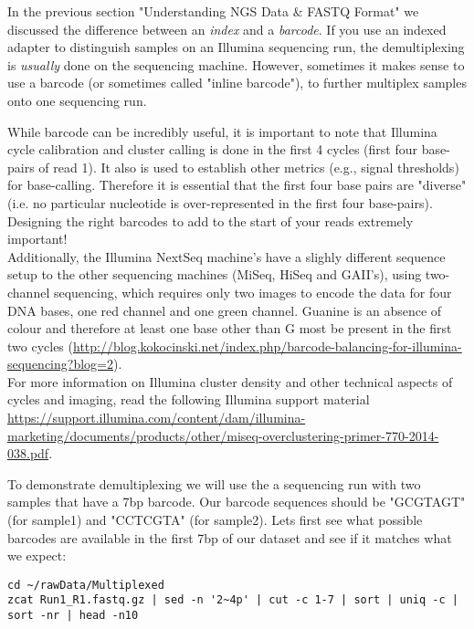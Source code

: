 In the previous section "Understanding NGS Data \& FASTQ Format" we discussed the difference between an \textit{index} and a \textit{barcode}. If you use an indexed adapter to distinguish samples on an Illumina sequencing run, the demultiplexing is \textit{usually} done on the sequencing machine. However, sometimes it makes sense to use a barcode (or sometimes called "inline barcode"), to further multiplex samples onto one sequencing run.\\

\begin{note}
While barcode can be incredibly useful, it is important to note that Illumina cycle calibration and cluster calling is done in the first 4 cycles (first four base-pairs of read 1). It also is used to establish other metrics (e.g., signal thresholds) for base-calling.
Therefore it is essential that the first four base pairs are "diverse" (i.e. no particular nucleotide is over-represented in the first four base-pairs). Designing the right barcodes to add to the start of your reads extremely important! \\
Additionally, the Illumina NextSeq machine's have a slighly different sequence setup to the other sequencing machines (MiSeq, HiSeq and GAII's), using two-channel sequencing, which requires only two images to encode the data for four DNA bases, one red channel and one green channel. Guanine is an absence of colour and therefore at least one base other than G most be present in the first two cycles (\url{http://blog.kokocinski.net/index.php/barcode-balancing-for-illumina-sequencing?blog=2}). \\
For more information on Illumina cluster density and other technical aspects of cycles and imaging, read the following Illumina support material \url{https://support.illumina.com/content/dam/illumina-marketing/documents/products/other/miseq-overclustering-primer-770-2014-038.pdf}.
\end{note}

\begin{steps}
To demonstrate demultiplexing we will use the a sequencing run with two samples that have a 7bp barcode. Our barcode sequences should be "GCGTAGT" (for sample1) and "CCTCGTA" (for sample2). Lets first see what possible barcodes are available in the first 7bp of our dataset and see if it matches what we expect:
\begin{lstlisting}
cd ~/rawData/Multiplexed
zcat Run1_R1.fastq.gz | sed -n '2~4p' | cut -c 1-7 | sort | uniq -c | sort -nr | head -n10
\end{lstlisting}
\end{steps}

